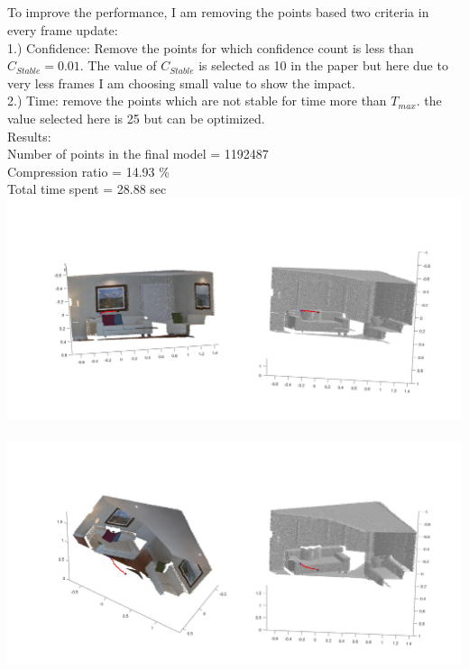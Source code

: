 \documentclass[fleqn]{article}
\begin{document}
\subsection{}
\begin{adjustwidth}{4em}{0pt}
	To improve the performance, I am removing the points based two criteria in every frame update:\\
	1.) Confidence: Remove the points for which confidence count is less than $C_{Stable} = 0.01$. The value of $C_{Stable}$ is selected as 10 in the paper but here due to very less frames I am choosing small value to show the impact.\\
	2.) Time: remove the points which are not stable for time more than $T_{max}$. the value selected here is 25 but can be optimized.\\
	Results:\\
	Number of points in the final model = 1192487 \\
	Compression ratio = 14.93 \% \\ 
	Total time spent = 28.88 sec \\
	\includegraphics[width = 1.25\textwidth,center]{slam_hw3_q2_d_part1_pic1.jpg}\\ \\
	\includegraphics[width = 1.25\textwidth,center]{slam_hw3_q2_d_part1_pic2.jpg}\\ \\

\end{adjustwidth}
\end{document}
